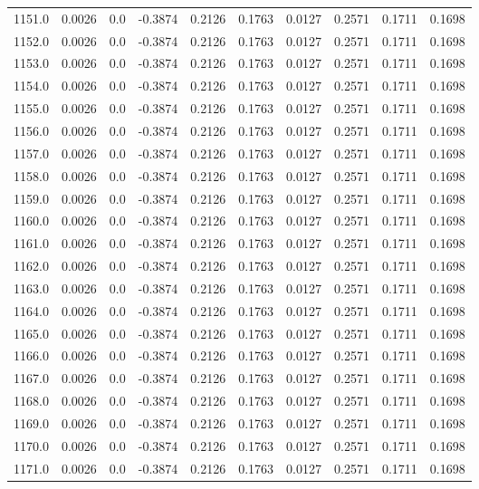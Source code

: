\begin{longtable}{lrrrrrrrrr}
1151.0 & 0.0026 & 0.0 & -0.3874 & 0.2126 & 0.1763 & 0.0127 & 0.2571 & 0.1711 & 0.1698 \\
1152.0 & 0.0026 & 0.0 & -0.3874 & 0.2126 & 0.1763 & 0.0127 & 0.2571 & 0.1711 & 0.1698 \\
1153.0 & 0.0026 & 0.0 & -0.3874 & 0.2126 & 0.1763 & 0.0127 & 0.2571 & 0.1711 & 0.1698 \\
1154.0 & 0.0026 & 0.0 & -0.3874 & 0.2126 & 0.1763 & 0.0127 & 0.2571 & 0.1711 & 0.1698 \\
1155.0 & 0.0026 & 0.0 & -0.3874 & 0.2126 & 0.1763 & 0.0127 & 0.2571 & 0.1711 & 0.1698 \\
1156.0 & 0.0026 & 0.0 & -0.3874 & 0.2126 & 0.1763 & 0.0127 & 0.2571 & 0.1711 & 0.1698 \\
1157.0 & 0.0026 & 0.0 & -0.3874 & 0.2126 & 0.1763 & 0.0127 & 0.2571 & 0.1711 & 0.1698 \\
1158.0 & 0.0026 & 0.0 & -0.3874 & 0.2126 & 0.1763 & 0.0127 & 0.2571 & 0.1711 & 0.1698 \\
1159.0 & 0.0026 & 0.0 & -0.3874 & 0.2126 & 0.1763 & 0.0127 & 0.2571 & 0.1711 & 0.1698 \\
1160.0 & 0.0026 & 0.0 & -0.3874 & 0.2126 & 0.1763 & 0.0127 & 0.2571 & 0.1711 & 0.1698 \\
1161.0 & 0.0026 & 0.0 & -0.3874 & 0.2126 & 0.1763 & 0.0127 & 0.2571 & 0.1711 & 0.1698 \\
1162.0 & 0.0026 & 0.0 & -0.3874 & 0.2126 & 0.1763 & 0.0127 & 0.2571 & 0.1711 & 0.1698 \\
1163.0 & 0.0026 & 0.0 & -0.3874 & 0.2126 & 0.1763 & 0.0127 & 0.2571 & 0.1711 & 0.1698 \\
1164.0 & 0.0026 & 0.0 & -0.3874 & 0.2126 & 0.1763 & 0.0127 & 0.2571 & 0.1711 & 0.1698 \\
1165.0 & 0.0026 & 0.0 & -0.3874 & 0.2126 & 0.1763 & 0.0127 & 0.2571 & 0.1711 & 0.1698 \\
1166.0 & 0.0026 & 0.0 & -0.3874 & 0.2126 & 0.1763 & 0.0127 & 0.2571 & 0.1711 & 0.1698 \\
1167.0 & 0.0026 & 0.0 & -0.3874 & 0.2126 & 0.1763 & 0.0127 & 0.2571 & 0.1711 & 0.1698 \\
1168.0 & 0.0026 & 0.0 & -0.3874 & 0.2126 & 0.1763 & 0.0127 & 0.2571 & 0.1711 & 0.1698 \\
1169.0 & 0.0026 & 0.0 & -0.3874 & 0.2126 & 0.1763 & 0.0127 & 0.2571 & 0.1711 & 0.1698 \\
1170.0 & 0.0026 & 0.0 & -0.3874 & 0.2126 & 0.1763 & 0.0127 & 0.2571 & 0.1711 & 0.1698 \\
1171.0 & 0.0026 & 0.0 & -0.3874 & 0.2126 & 0.1763 & 0.0127 & 0.2571 & 0.1711 & 0.1698 \\

\end{longtable}
